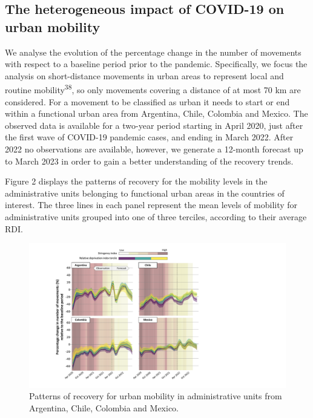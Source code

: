 \documentclass[
  11pt,
]{article}
\begin{document}
\subsection{The heterogeneous impact of COVID-19 on urban
mobility}\label{the-heterogeneous-impact-of-covid-19-on-urban-mobility}

We analyse the evolution of the percentage change in the number of
movements with respect to a baseline period prior to the pandemic.
Specifically, we focus the analysis on short-distance movements in urban
areas to represent local and routine mobility\textsuperscript{38}, so
only movements covering a distance of at most 70 km are considered. For
a movement to be classified as urban it needs to start or end within a
functional urban area from Argentina, Chile, Colombia and Mexico. The
observed data is available for a two-year period starting in April 2020,
just after the first wave of COVID-19 pandemic cases, and ending in
March 2022. After 2022 no observations are available, however, we
generate a 12-month forecast up to March 2023 in order to gain a better
understanding of the recovery trends.

Figure 2 displays the patterns of recovery for the mobility levels in
the administrative units belonging to functional urban areas in the
countries of interest. The three lines in each panel represent the mean
levels of mobility for administrative units grouped into one of three
terciles, according to their average RDI.

\begin{figure}[H]

{\centering \includegraphics{figures/prediction-rdi-band.pdf}

}

\caption{Patterns of recovery for urban mobility in administrative units
from Argentina, Chile, Colombia and Mexico.}

\end{figure}%
\end{document}
